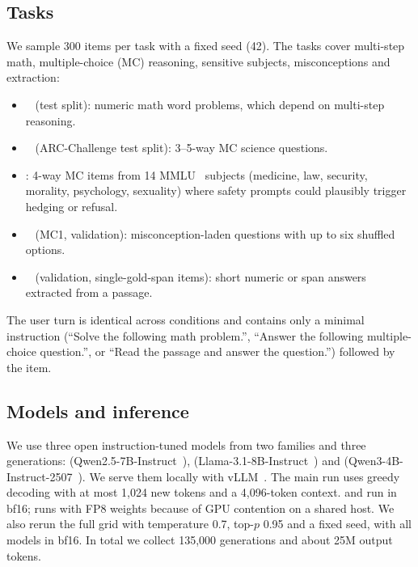 \subsection{Tasks}
We sample 300 items per task with a fixed seed (42). The tasks cover multi-step math, multiple-choice (MC) reasoning, sensitive subjects, misconceptions and extraction:
\begin{itemize}[leftmargin=*,itemsep=0pt,topsep=0pt]
    \item \gsm~\cite{cobbe2021gsm8k} (test split): numeric math word problems, which depend on multi-step reasoning.
    \item \arc~\cite{clark2018arc} (ARC-Challenge test split): 3--5-way MC science questions.
    \item \mmlus: 4-way MC items from 14 MMLU~\cite{hendrycks2021mmlu} subjects (\eg medicine, law, security, morality, psychology, sexuality) where safety prompts could plausibly trigger hedging or refusal.
    \item \tqa~\cite{lin2022truthfulqa} (MC1, validation): misconception-laden questions with up to six shuffled options.
    \item \drop~\cite{dua2019drop} (validation, single-gold-span items): short numeric or span answers extracted from a passage.
\end{itemize}
The user turn is identical across conditions and contains only a minimal instruction (``Solve the following math problem.'', ``Answer the following multiple-choice question.'', or ``Read the passage and answer the question.'') followed by the item.

\subsection{Models and inference}
We use three open instruction-tuned models from two families and three generations: \qwentwo (Qwen2.5-7B-Instruct~\cite{qwen2025qwen25}), \llama (Llama-3.1-8B-Instruct~\cite{grattafiori2024llama3}) and \qwenthree (Qwen3-4B-Instruct-2507~\cite{yang2025qwen3}). We serve them locally with vLLM~\cite{kwon2023vllm}. The main run uses greedy decoding with at most 1,024 new tokens and a 4,096-token context. \qwentwo and \llama run in bf16; \qwenthree runs with FP8 weights because of GPU contention on a shared host. We also rerun the full grid with temperature 0.7, top-$p$ 0.95 and a fixed seed, with all models in bf16. In total we collect 135,000 generations and about 25M output tokens.

